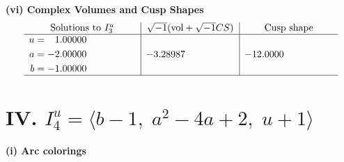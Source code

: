 \documentclass[1p]{elsarticle_modified}
\theoremstyle{definition}
\newcommand{\I}{\sqrt{-1}}
\begin{document}
\newpage\flushleft \textbf{(vi) Complex Volumes and Cusp Shapes}
$$\begin{array}{c|c|c}  
\text{Solutions to }I^u_{3}& \I (\text{vol} + \sqrt{-1}CS) & \text{Cusp shape}\\
 \hline 
\begin{aligned}
u &= \phantom{-}1.00000\phantom{ +0.000000I} \\
a &= -2.00000\phantom{ +0.000000I} \\
b &= -1.00000\phantom{ +0.000000I}\end{aligned}
 & -3.28987\phantom{ +0.000000I} & -12.0000\phantom{ +0.000000I}\\
 \hline 
 \end{array}$$\newpage\newpage\renewcommand{\arraystretch}{1}
\centering \section*{IV. $I^u_{4}= \langle b-1,\;a^2-4 a+2,\;u+1 \rangle$}
\flushleft \textbf{(i) Arc colorings}\\
\end{document}
